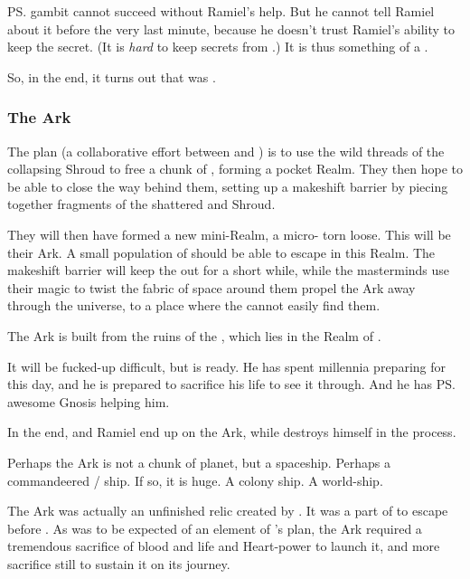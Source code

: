 \ps{\Azraid} gambit cannot succeed without Ramiel's help. 
But he cannot tell Ramiel about it before the very last minute, because he doesn't trust Ramiel's ability to keep the secret. 
(It is \emph{hard} to keep secrets from \Daggerrain.) 
It is thus something of a . 

So, in the end, it turns out that \Azraid{} was . 





\subsubsection{The Ark}
The plan (a collaborative effort between \Azraid{} and \Ishnaruchaefir) is to use the wild threads of the collapsing Shroud to  free a chunk of \Miith{}, forming a pocket Realm. 
They then hope to be able to close the way behind them, setting up a makeshift barrier by piecing together fragments of the shattered \CrystalSphere{} and Shroud.

They will then have formed a new mini-Realm, a micro-\Miith{} torn loose. 
This will be their Ark. 
A small population of \Miithians should be able to escape in this Realm. 
The makeshift barrier will keep the \banes{} out for a short while, while the masterminds use their magic to twist the fabric of space around them propel the Ark away through the universe, to a place where the \banes{} cannot easily find them. 

The Ark is built from the ruins of the , which lies in the Realm of . 

It will be fucked-up difficult, but \Azraid{} is ready. 
He has spent millennia preparing for this day, and he is prepared to sacrifice his life to see it through. 
And he has \ps{\Ishnaruchaefir} awesome Gnosis helping him. 

In the end, \Ishnaruchaefir{} and Ramiel end up on the Ark, while \Azraid{} destroys himself in the process. 

Perhaps the Ark is not a chunk of planet, but a spaceship. 
Perhaps a commandeered \bane/\resphan{} ship. 
If so, it is huge. 
A colony ship. 
A world-ship. 

The Ark was actually an unfinished relic created by \Sethicus. 
It was a part of  to escape \Miith before . 
As was to be expected of an element of \Sethicus's plan, the Ark required a tremendous sacrifice of blood and life and Heart-power to launch it, and more sacrifice still to sustain it on its journey. 

